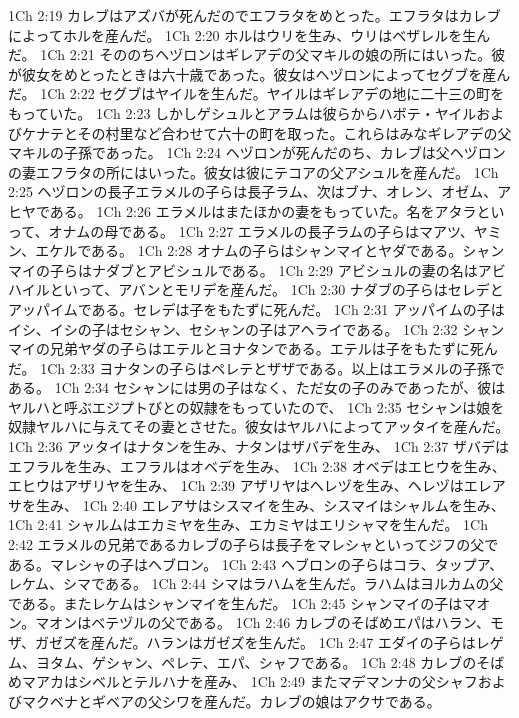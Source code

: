1Ch 2:19  カレブはアズバが死んだのでエフラタをめとった。エフラタはカレブによってホルを産んだ。
1Ch 2:20  ホルはウリを生み、ウリはベザレルを生んだ。
1Ch 2:21  そののちヘヅロンはギレアデの父マキルの娘の所にはいった。彼が彼女をめとったときは六十歳であった。彼女はヘヅロンによってセグブを産んだ。
1Ch 2:22  セグブはヤイルを生んだ。ヤイルはギレアデの地に二十三の町をもっていた。
1Ch 2:23  しかしゲシュルとアラムは彼らからハボテ・ヤイルおよびケナテとその村里など合わせて六十の町を取った。これらはみなギレアデの父マキルの子孫であった。
1Ch 2:24  ヘヅロンが死んだのち、カレブは父ヘヅロンの妻エフラタの所にはいった。彼女は彼にテコアの父アシュルを産んだ。
1Ch 2:25  ヘヅロンの長子エラメルの子らは長子ラム、次はブナ、オレン、オゼム、アヒヤである。
1Ch 2:26  エラメルはまたほかの妻をもっていた。名をアタラといって、オナムの母である。
1Ch 2:27  エラメルの長子ラムの子らはマアツ、ヤミン、エケルである。
1Ch 2:28  オナムの子らはシャンマイとヤダである。シャンマイの子らはナダブとアビシュルである。
1Ch 2:29  アビシュルの妻の名はアビハイルといって、アバンとモリデを産んだ。
1Ch 2:30  ナダブの子らはセレデとアッパイムである。セレデは子をもたずに死んだ。
1Ch 2:31  アッパイムの子はイシ、イシの子はセシャン、セシャンの子はアヘライである。
1Ch 2:32  シャンマイの兄弟ヤダの子らはエテルとヨナタンである。エテルは子をもたずに死んだ。
1Ch 2:33  ヨナタンの子らはペレテとザザである。以上はエラメルの子孫である。
1Ch 2:34  セシャンには男の子はなく、ただ女の子のみであったが、彼はヤルハと呼ぶエジプトびとの奴隷をもっていたので、
1Ch 2:35  セシャンは娘を奴隷ヤルハに与えてその妻とさせた。彼女はヤルハによってアッタイを産んだ。
1Ch 2:36  アッタイはナタンを生み、ナタンはザバデを生み、
1Ch 2:37  ザバデはエフラルを生み、エフラルはオベデを生み、
1Ch 2:38  オベデはエヒウを生み、エヒウはアザリヤを生み、
1Ch 2:39  アザリヤはヘレヅを生み、ヘレヅはエレアサを生み、
1Ch 2:40  エレアサはシスマイを生み、シスマイはシャルムを生み、
1Ch 2:41  シャルムはエカミヤを生み、エカミヤはエリシャマを生んだ。
1Ch 2:42  エラメルの兄弟であるカレブの子らは長子をマレシャといってジフの父である。マレシャの子はヘブロン。
1Ch 2:43  ヘブロンの子らはコラ、タップア、レケム、シマである。
1Ch 2:44  シマはラハムを生んだ。ラハムはヨルカムの父である。またレケムはシャンマイを生んだ。
1Ch 2:45  シャンマイの子はマオン。マオンはベテヅルの父である。
1Ch 2:46  カレブのそばめエパはハラン、モザ、ガゼズを産んだ。ハランはガゼズを生んだ。
1Ch 2:47  エダイの子らはレゲム、ヨタム、ゲシャン、ペレテ、エパ、シャフである。
1Ch 2:48  カレブのそばめマアカはシベルとテルハナを産み、
1Ch 2:49  またマデマンナの父シャフおよびマクベナとギベアの父シワを産んだ。カレブの娘はアクサである。
